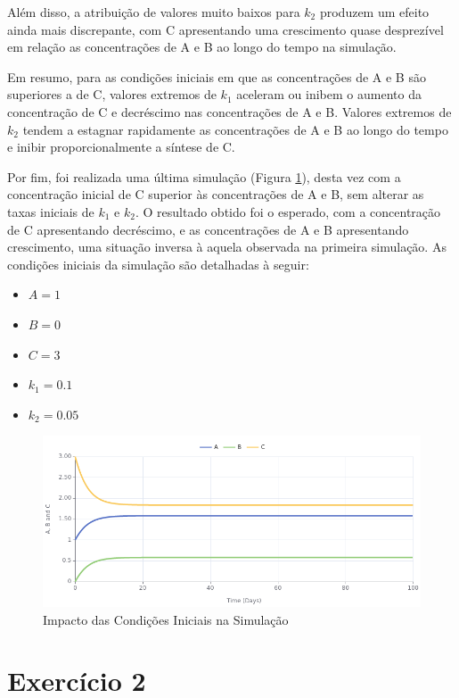 \documentclass[a4paper, 12pt]{article}
\begin{document}
Além disso, a atribuição de valores muito baixos para \(k_2\) produzem um efeito ainda mais discrepante, com C apresentando uma crescimento quase desprezível em relação as concentrações de A e B ao longo do tempo na simulação.

Em resumo, para as condições iniciais em que as concentrações de A e B são superiores a de C, valores extremos de \(k_1\) aceleram ou inibem o aumento da concentração de C e decréscimo nas concentrações de A e B. Valores extremos de \(k_2\) tendem a estagnar rapidamente as concentrações de A e B ao longo do tempo e inibir proporcionalmente a síntese de C.

Por fim, foi realizada uma última simulação (Figura \ref{fig:exampleFig5}), desta vez com a concentração inicial de C superior às concentrações de A e B, sem alterar as taxas iniciais de \(k_1\) e \(k_2\). O resultado obtido foi o esperado, com a concentração de C apresentando decréscimo, e as concentrações de A e B apresentando crescimento, uma situação inversa à aquela observada na primeira simulação. As condições iniciais da simulação são detalhadas à seguir:

\begin{itemize}
    \item \(A = 1\)
    \item \(B = 0\)
    \item \(C = 3\)
    \item \(k_1 = 0.1\)
    \item \(k_2 = 0.05\)
\end{itemize}

\begin{figure}[H]
    \centering
    \includegraphics[width=1\textwidth]{Images/Exercise 1/c.png}
    \caption{Impacto das Condições Iniciais na Simulação}
    \label{fig:exampleFig5}
\end{figure}

\section*{Exercício 2}
\end{document}

